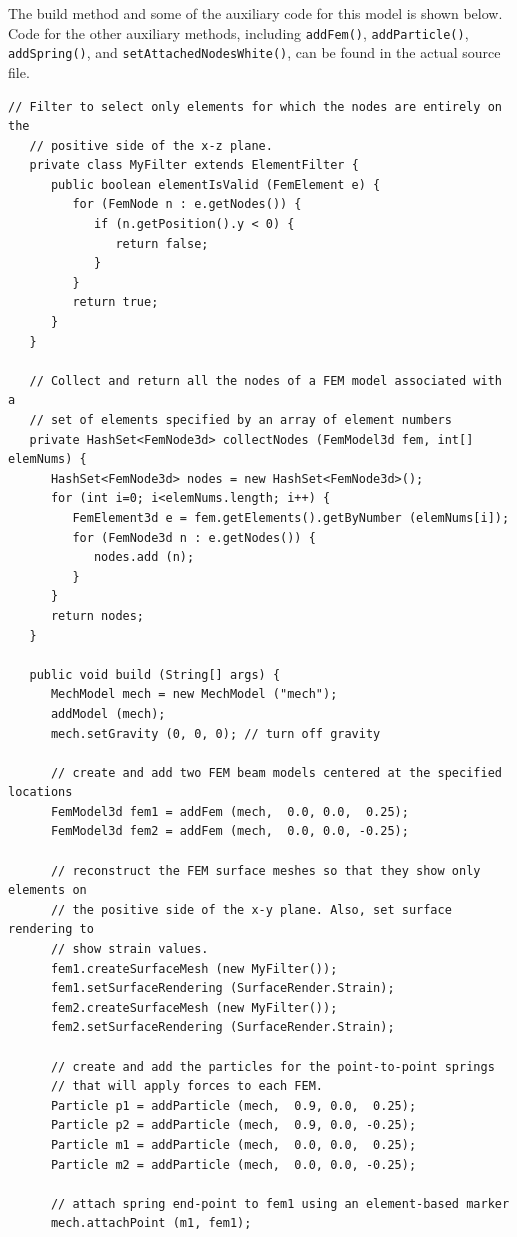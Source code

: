 The build method and some of the auxiliary code for this model is shown below.
Code for the other auxiliary methods, including {\tt addFem()},
{\tt addParticle()}, {\tt addSpring()}, and {\tt setAttachedNodesWhite()},
can be found in the actual source file.
\lstset{numbers=left}
\begin{lstlisting}[]
   // Filter to select only elements for which the nodes are entirely on the
   // positive side of the x-z plane.
   private class MyFilter extends ElementFilter {
      public boolean elementIsValid (FemElement e) {
         for (FemNode n : e.getNodes()) {
            if (n.getPosition().y < 0) {
               return false;
            }
         }
         return true;         
      }
   }

   // Collect and return all the nodes of a FEM model associated with a
   // set of elements specified by an array of element numbers
   private HashSet<FemNode3d> collectNodes (FemModel3d fem, int[] elemNums) {
      HashSet<FemNode3d> nodes = new HashSet<FemNode3d>();
      for (int i=0; i<elemNums.length; i++) {
         FemElement3d e = fem.getElements().getByNumber (elemNums[i]);
         for (FemNode3d n : e.getNodes()) {
            nodes.add (n);
         }
      }
      return nodes;
   }

   public void build (String[] args) {
      MechModel mech = new MechModel ("mech");
      addModel (mech);
      mech.setGravity (0, 0, 0); // turn off gravity

      // create and add two FEM beam models centered at the specified locations
      FemModel3d fem1 = addFem (mech,  0.0, 0.0,  0.25);
      FemModel3d fem2 = addFem (mech,  0.0, 0.0, -0.25);

      // reconstruct the FEM surface meshes so that they show only elements on
      // the positive side of the x-y plane. Also, set surface rendering to
      // show strain values.
      fem1.createSurfaceMesh (new MyFilter());
      fem1.setSurfaceRendering (SurfaceRender.Strain);
      fem2.createSurfaceMesh (new MyFilter());
      fem2.setSurfaceRendering (SurfaceRender.Strain);

      // create and add the particles for the point-to-point springs
      // that will apply forces to each FEM.
      Particle p1 = addParticle (mech,  0.9, 0.0,  0.25);
      Particle p2 = addParticle (mech,  0.9, 0.0, -0.25);
      Particle m1 = addParticle (mech,  0.0, 0.0,  0.25);
      Particle m2 = addParticle (mech,  0.0, 0.0, -0.25);

      // attach spring end-point to fem1 using an element-based marker
      mech.attachPoint (m1, fem1);


\end{lstlisting}
